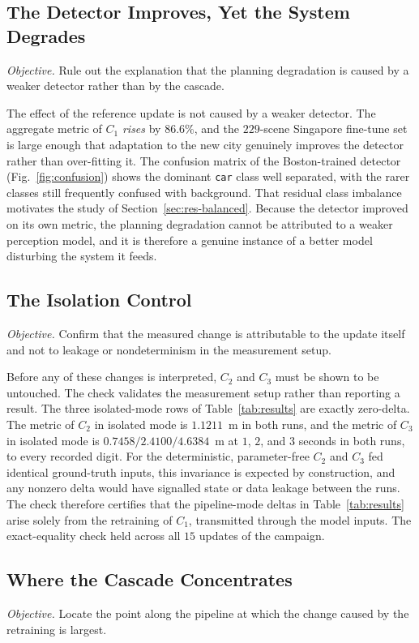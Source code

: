 \documentclass[conference]{IEEEtran}
\begin{document}
\subsection{The Detector Improves, Yet the System Degrades}
\label{sec:res-decouple}
\emph{Objective.} Rule out the explanation that the planning degradation is caused
by a weaker detector rather than by the cascade.

The effect of the reference update is not caused by a weaker detector. The aggregate
metric of $C_1$ \emph{rises} by $86.6\%$, and the $229$-scene Singapore fine-tune set
is large enough that adaptation to the new city genuinely improves the detector
rather than over-fitting it. The confusion matrix of the Boston-trained detector
(Fig.~\ref{fig:confusion}) shows the dominant \texttt{car} class well separated,
with the rarer classes still frequently confused with background. That residual
class imbalance motivates the study of Section~\ref{sec:res-balanced}. Because the
detector improved on its own metric, the planning degradation cannot be attributed
to a weaker perception model, and it is therefore a genuine instance of a better
model disturbing the system it feeds.

\subsection{The Isolation Control}
\label{sec:res-iso}
\emph{Objective.} Confirm that the measured change is attributable to the update
itself and not to leakage or nondeterminism in the measurement setup.

Before any of these changes is interpreted, $C_2$ and $C_3$ must be shown to be
untouched. The check validates the measurement setup rather than reporting a result. The
three isolated-mode rows of Table~\ref{tab:results} are exactly zero-delta. The
metric of $C_2$ in isolated mode is $1.1211$~m in both runs, and the metric of
$C_3$ in isolated mode is $0.7458 / 2.4100 / 4.6384$~m at $1$, $2$, and $3$ seconds in
both runs, to every recorded digit. For the deterministic, parameter-free $C_2$
and $C_3$ fed identical ground-truth inputs, this invariance is expected by
construction, and any nonzero delta would have signalled state or data leakage
between the runs. The check therefore certifies that the pipeline-mode deltas in
Table~\ref{tab:results} arise solely from the retraining of $C_1$, transmitted
through the model inputs. The exact-equality check held across all $15$
updates of the campaign.

\subsection{Where the Cascade Concentrates}
\label{sec:res-interface}
\emph{Objective.} Locate the point along the pipeline at which the change caused
by the retraining is largest.
\end{document}

